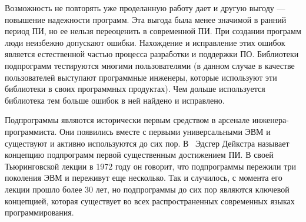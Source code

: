 Возможность не повторять уже проделанную работу дает и другую выгоду — повышение надежности программ. Эта выгода была менее значимой в ранний период ПИ, но ее нельзя переоценить в современной ПИ. При создании программ люди неизбежно допускают ошибки. Нахождение и исправление этих ошибок является естественной частью процесса разработки и поддержки ПО. Библиотеки подпрограмм тестируются многими пользователями (в данном случае в качестве пользователей выступают программные инженеры, которые используют эти библиотеки в своих программных продуктах). Чем дольше используется библиотека тем больше ошибок в ней найдено и исправлено.

Подпрограммы являются исторически первым средством в арсенале инженера-программиста. Они появились вместе с первыми универсальными ЭВМ и существуют и активно используются до сих пор. В~\cite{Dijkstra:1972:HP} Эдсгер Дейкстра называет концепцию подпрограмм первой существенным достижением ПИ. В своей Тьюринговской лекции в 1972 году он говорит, что подпрограммы пережили три поколения ЭВМ и переживут еще несколько. Так и случилось, с момента его лекции прошло более 30 лет, но подпрограммы до сих пор являются ключевой концепцией, которая существует во всех распространенных современных языках программирования.
